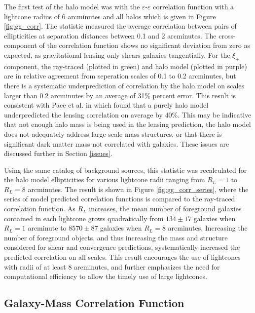 \documentclass[%
 reprint,
 amsmath,amssymb,
 aps,nofootinbib
]{revtex4-1}
\begin{document}
The first test of the halo model was with the $\varepsilon$-$\varepsilon$ correlation function with a lightcone radius of 6 arcminutes and all halos which is given in Figure \ref{fig:gg_corr}. The statistic measured the average correlation between pairs of ellipticities at separation distances between 0.1 and 2 arcminutes. The cross-component of the correlation function shows no significant deviation from zero as expected, as gravitational lensing only shears galaxies tangentially. For the $\xi_+$ component, the ray-traced (plotted in green) and halo model (plotted in purple) are in relative agreement from seperation scales of 0.1 to 0.2 arcminutes, but there is a systematic underprediction of correlation by the halo model on scales larger than 0.2 arcminutes by an average of 31\% percent error. This result is consistent with Pace et al. in \cite{pace} which found that a purely halo model underpredicted the lensing correlation on average by 40\%. This may be indicative that not enough halo mass is being used in the lensing prediction, the halo model does not adequately address large-scale mass structures, or that there is significant dark matter mass not correlated with galaxies.  These issues are discussed further in Section \ref{issues}.

Using the same catalog of background sources, this statistic was recalculated for the halo model ellipticities for various lightcone radii ranging from $R_L=1$ to $R_L=8$ arcminutes. The result is shown in Figure \ref{fig:gg_corr_series}, where the series of model predicted correlation functions is compared to the ray-traced correlation function. As $R_L$ increases, the mean number of foreground galaxies contained in each lightcone grows quadratically from ${134\pm17}$ galaxies when $R_L=1$ arcminute to ${8570\pm87}$ galaxies when $R_L=8$ arcminutes. Increasing the number of foreground objects, and thus increasing the mass and structure considered for shear and convergence predictions, systematically increased the predicted correlation on all scales. This result encourages the use of lightcones with radii of at least 8 arcminutes, and further emphasizes the need for computational efficiency to allow the timely use of large lightcones.


\subsection{Galaxy-Mass Correlation Function}
\end{document}
